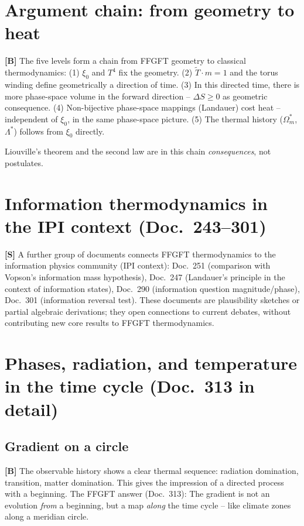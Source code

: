 \section{Argument chain: from geometry to heat}

\textbf{[B]} The five levels form a chain from FFGFT geometry
to classical thermodynamics:
(1) $\xi_0$ and $T^4$ fix the geometry.
(2) $\tilde{T} \cdot m = 1$ and the torus winding define
geometrically a direction of time.
(3) In this directed time, there is more phase-space volume in
the forward direction -- $\Delta S \ge 0$ as geometric consequence.
(4) Non-bijective phase-space mappings (Landauer) cost heat --
independent of $\xi_0$, in the same phase-space picture.
(5) The thermal history ($\Omega_m^*$, $\Lambda^*$) follows from
$\xi_0$ directly.

Liouville's theorem and the second law are in this chain
\emph{consequences}, not postulates.

\section{Information thermodynamics in the IPI context (Doc.~243--301)}

\textbf{[S]} A further group of documents connects FFGFT thermodynamics
to the information physics community (IPI context):
Doc.~251 (comparison with Vopson's information mass hypothesis),
Doc.~247 (Landauer's principle in the context of information states),
Doc.~290 (information question magnitude/phase),
Doc.~301 (information reversal test).
These documents are plausibility sketches or partial algebraic
derivations; they open connections to current debates,
without contributing new core results to FFGFT thermodynamics.

\section{Phases, radiation, and temperature in the time cycle (Doc.~313 in detail)}

\subsection{Gradient on a circle}

\textbf{[B]} The observable history shows a clear thermal
sequence: radiation domination, transition, matter domination.
This gives the impression of a directed process with a beginning.
The FFGFT answer (Doc.~313): The gradient is not an evolution
\emph{from} a beginning, but a map \emph{along} the
time cycle -- like climate zones along a meridian circle.

